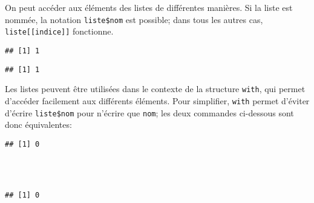 On peut accéder aux éléments des listes de différentes manières.
Si la liste est nommée, la notation \texttt{liste\$nom} est possible; dans tous les autres cas, \texttt{liste[[indice]]} fonctionne.

\begin{knitrout}
\color{fgcolor}\begin{kframe}
\begin{flushleft}
\ttfamily\noindent
{}\hlkeyword{\usebox{\hlnormalsizeboxdollar}}\mbox{}
\normalfont
\end{flushleft}
\begin{verbatim}
## [1] 1
\end{verbatim}
\begin{flushleft}
\ttfamily\noindent
{}\hlkeyword{[[}\hlkeyword{]}\hlkeyword{]}\mbox{}
\normalfont
\end{flushleft}
\begin{verbatim}
## [1] 1
\end{verbatim}
\end{kframe}
\end{knitrout}


Les listes peuvent être utilisées dans le contexte de la structure \texttt{with}, qui permet d'accéder facilement aux différents éléments.
Pour simplifier, \texttt{with} permet d'éviter d'écrire \texttt{liste\$nom} pour n'écrire que \texttt{nom}; les deux commandes ci-dessous sont donc équivalentes:

\begin{knitrout}
\color{fgcolor}\begin{kframe}
\begin{flushleft}
\ttfamily\noindent
{}\hlkeyword{\usebox{\hlnormalsizeboxdollar}}\hlkeyword{+}{\ }\hlkeyword{\usebox{\hlnormalsizeboxdollar}}\hlkeyword{-}{\ }\hlkeyword{\usebox{\hlnormalsizeboxdollar}}\mbox{}
\normalfont
\end{flushleft}
\begin{verbatim}
## [1] 0
\end{verbatim}
\begin{flushleft}
\ttfamily\noindent
{}\hlkeyword{(}\hlkeyword{,}{\ }\hlkeyword{\usebox{\hlnormalsizeboxopenbrace}}\hspace*{\fill}\\
\hlstd{}{\ }{\ }{\ }{\ }\hlkeyword{+}{\ }\hlkeyword{-}{\ }\hspace*{\fill}\\
\hlstd{}\hlkeyword{\usebox{\hlnormalsizeboxclosebrace}}\hlkeyword{)}\mbox{}
\normalfont
\end{flushleft}
\begin{verbatim}
## [1] 0
\end{verbatim}
\end{kframe}
\end{knitrout}


